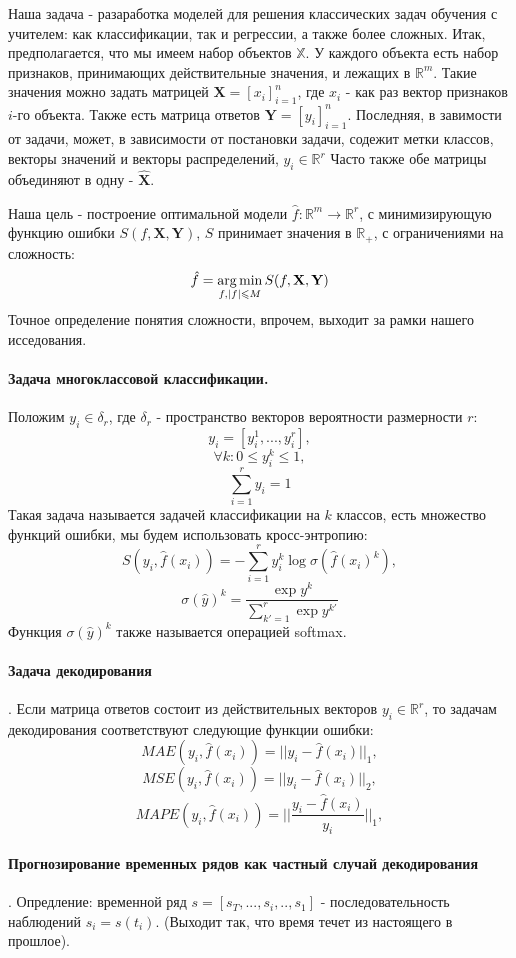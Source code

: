 \documentclass[12pt,twoside]{article}
\begin{document}
Наша задача  - разаработка моделей для решения классических задач обучения с учителем: как классификации, так и регрессии, а также более сложных. Итак, предполагается, что мы имеем набор объектов $\mathbb{X}$.  У каждого объекта есть набор признаков, принимающих действительные значения,  и лежащих в $\mathbb{R}^m$.  Такие значения можно задать матрицей 
$\mathbf{X} = [x_i]_{i = 1}^n$, где $x_i$ -  как раз вектор признаков $i$-го объекта. Также есть матрица ответов $\mathbf{Y} = [y_i]_{i = 1}^n$. Последняя, в завимости от задачи, может, в зависимости от постановки задачи, содежит метки классов, векторы значений и векторы распределений, $y_i \in \mathbb{R}^r$ Часто также обе матрицы объединяют в одну - $\hat{\mathbf{X}}$.

Наша цель - построение оптимальной модели $\hat{f}: \mathbb{R}^m \rightarrow \mathbb{R}^r$, с минимизирующую функцию ошибки $S(f,  \mathbf{X}, \mathbf{Y})$, $S$ принимает значения в $\mathbb{R}_+$, с ограничениями на сложность:
$$ \hat{f} = \argmin\limits_{f, |f| \leq M}{S(f, \mathbf{X}, \mathbf{Y})}$$ 
Точное определение понятия сложности, впрочем, выходит за рамки нашего исседования. 

\paragraph{Задача многоклассовой классификации.}
Положим $y_i \in \delta_r$, где $\delta_r$ - пространство векторов вероятности размерности $r$:
$$ y_i = [y_i^1, ..., y_i^r],$$
$$ \forall k: 0 \leq y_i^k  \leq 1,$$
$$ \sum\limits_{i = 1}^r y_i = 1$$	
Такая задача называется задачей классификации на $k$ классов, есть множество функций ошибки, мы будем использовать кросс-энтропию: 
$$S(y_i, \hat{f}(x_i)) =  - \sum\limits_{i=1}^r y_i^k \log \sigma(\hat{f}(x_i)^k), $$
$$\sigma (\hat{y})^k = \frac{\exp y^k}{\sum\limits_{k' = 1}^{r} \exp y^{k'}} $$
Функция $\sigma (\hat{y})^k $ также называется операцией softmax.

\paragraph{Задача декодирования}.
Если матрица ответов состоит из действительных векторов  $y_i \in \mathbb{R}^r$, то задачам декодирования соответствуют следующие функции ошибки:
$$MAE(y_i, \hat{f}(x_i)) = || y_i - \hat{f}(x_i) ||_1,$$
$$MSE(y_i, \hat{f}(x_i)) = || y_i - \hat{f}(x_i) ||_2,$$
$$MAPE(y_i, \hat{f}(x_i)) = ||\frac{ y_i - \hat{f}(x_i)}{y_i} ||_1,$$

\paragraph{Прогнозирование временных рядов как частный случай декодирования}.
Опредление:  временной ряд $s = [s_T, ... , s_i, .. , s_1]$ - последовательность наблюдений $s_i = s(t_i)$. (Выходит так, что время течет из настоящего в прошлое).
\end{document}

